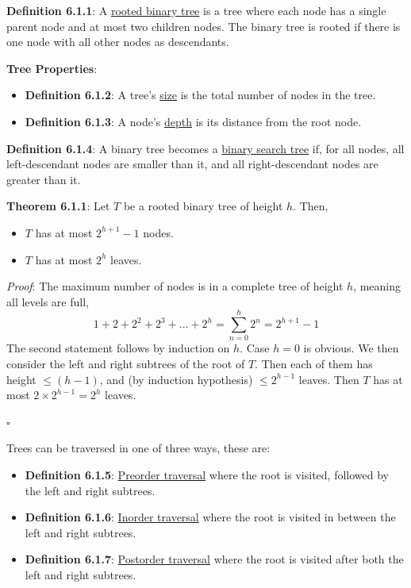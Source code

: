 \documentclass{article}
\newcommand{\separate}[1] {\vspace{#1 pt}\noindent}
\newcommand{\definition}[2]{\textbf{Definition #1}: #2\label{def:#1}}
\newcommand{\proof}[2]{\textit{Proof}: #2 \begin{flushright}\(\square\)\end{flushright}\label{prf:#1}}
\newcommand{\theorem}[3]{\textbf{Theorem #1}: #2 \par\noindent \proof{thm:#1}{#3}\label{thm:#1}}
\begin{document}
\definition{6.1.1}{A \underline{rooted binary tree} is a tree where each node has a single parent node and at most two children nodes. The binary tree is rooted if there is one node with all other nodes as descendants.}

\separate{5}\textbf{Tree Properties}:
\begin{itemize}
    \item \definition{6.1.2}{A tree's \underline{size} is the total number of nodes in the tree.}
    \item \definition{6.1.3}{A node's \underline{depth} is its distance from the root node.}
\end{itemize}

\separate{5}\definition{6.1.4}{A binary tree becomes a \underline{binary search tree} if, for all nodes, all left-descendant nodes are smaller than it, and all right-descendant nodes are greater than it.}

\newpage\noindent\theorem{6.1.1}{Let \(T\) be a rooted binary tree of height \(h\). Then,
\begin{itemize}
    \item \(T\) has at most \(2^{h+1}-1\) nodes.
    \item \(T\) has at most \(2^h\) leaves.
\end{itemize}}
{The maximum number of nodes is in a complete tree of height \(h\), meaning all levels are full,
\begin{equation}
    1 + 2 + 2^2 + 2^3 + ... + 2^h 
    = \sum^h_{n=0} 2^n 
    = 2^{h+1} - 1
\end{equation}
The second statement follows by induction on \(h\). Case \(h=0\) is obvious. We then consider the left and right subtrees of the root of \(T\).
Then each of them has height \(\leq (h-1)\), and (by induction hypothesis) \(\leq 2^{h-1}\) leaves. Then \(T\) has at most \(2 \times 2^{h-1} = 2^h\) leaves.}

\separate{5}Trees can be traversed in one of three ways, these are:
\begin{itemize}
    \item \definition{6.1.5}{\underline{Preorder traversal} where the root is visited, followed by the left and right subtrees.}
    \item \definition{6.1.6}{\underline{Inorder traversal} where the root is visited in between the left and right subtrees.}
    \item \definition{6.1.7}{\underline{Postorder traversal} where the root is visited after both the left and right subtrees.}
\end{itemize}
\end{document}
